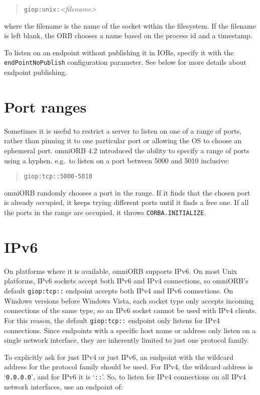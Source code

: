 \documentclass[11pt,oneside,a4paper]{book}
\newcommand{\code}[1]{\texttt{#1}}
\begin{document}
\begin{quote}
\code{giop:unix:}\textit{<filename>}
\end{quote}

\noindent where the filename is the name of the socket within the
filesystem. If the filename is left blank, the ORB chooses a name
based on the process id and a timestamp.

To listen on an endpoint without publishing it in IORs, specify it
with the \code{endPointNoPublish} configuration parameter. See below
for more details about endpoint publishing.


\section{Port ranges}

Sometimes it is useful to restrict a server to listen on one of a
range of ports, rather than pinning it to one particular port or
allowing the OS to choose an ephemeral port. omniORB 4.2 introduced
the ability to specify a range of ports using a hyphen. e.g.\ to
listen on a port between 5000 and 5010 inclusive:

\begin{quote}
\code{giop:tcp::5000-5010}
\end{quote}

\noindent omniORB randomly chooses a port in the range. If it finds
that the chosen port is already occupied, it keeps trying different
ports until it finds a free one. If all the ports in the range are
occupied, it throws \code{CORBA.INITIALIZE}.


\section{IPv6}

On platforms where it is available, omniORB supports IPv6. On most
Unix platforms, IPv6 sockets accept both IPv6 and IPv4 connections, so
omniORB's default \code{giop:tcp::} endpoint accepts both IPv4 and
IPv6 connections. On Windows versions before Windows Vista, each
socket type only accepts incoming connections of the same type, so an
IPv6 socket cannot be used with IPv4 clients. For this reason, the
default \code{giop:tcp::} endpoint only listens for IPv4 connections.
Since endpoints with a specific host name or address only listen on a
single network interface, they are inherently limited to just one
protocol family.

To explicitly ask for just IPv4 or just IPv6, an endpoint with the
wildcard address for the protocol family should be used. For IPv4, the
wildcard address is `\code{0.0.0.0}', and for IPv6 it is `\code{::}'.
So, to listen for IPv4 connections on all IPv4 network interfaces, use
an endpoint of:
\end{document}
